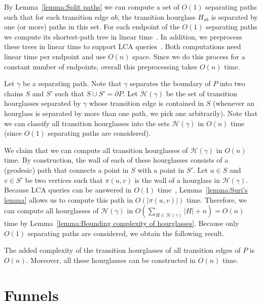 \documentclass[a4paper,UKenglish]{lipics}
\newcommand{\p}[2]{\ensuremath{\pi(#1, #2)}}
\begin{document}
By Lemma~\ref{lemma:Split paths} we can compute a set of $O(1)$ separating paths such that for each transition edge $ab$, the transition hourglass $H_{ab}$ is separated by one (or more) paths in this set. For each endpoint of the $O(1)$ separating paths we compute its shortest-path tree in linear time~\cite{chazelle1991triangulating,guibasShortestPathTree}. In addition, we preprocess these trees in linear time to support LCA queries~\cite{harel1984fast}. Both computations need linear time per endpoint and use $O(n)$ space. Since we do this process for a constant number of endpoints, overall this preprocessing takes $O(n)$ time. 

Let $\gamma$ be a separating path. Note that $\gamma$ separates the boundary of $P$ into two chains $S$ and $S'$ such that $S\cup S' = \partial P$.
Let $\mathcal H(\gamma)$ be the set of transition hourglasses separated by $\gamma$ whose transition edge is contained in $S$ (whenever an hourglass is separated by more than one path, we pick one arbitrarily). Note that we can classify all transition hourglasses into the sets $\mathcal H(\gamma)$ in $O(n)$ time (since $O(1)$ separating paths are considered).

We claim that we can compute all transition hourglasses of $\mathcal H(\gamma)$ in $O(n)$ time.
By construction, the wall of each of these hourglasses consists of a (geodesic) path that connects a point in $S$ with a point in $S'$. Let $u\in S$ and $v\in S'$ be two vertices such that $\p{u}{v}$ is the wall of a hourglass in $\mathcal H(\gamma)$.
Because LCA queries can be answered in $O(1)$ time~\cite{harel1984fast}, 
Lemma~\ref{lemma:Suri's lemma} allows us to compute this path in $O(|\p{u}{v}|)$ time. 
Therefore, we can compute all hourglasses of $\mathcal H(\gamma)$ in $O(\sum_{H\in \mathcal H(\gamma)} |H| + n) = O(n)$ time by Lemma~\ref{lemma:Bounding complexity of hourglasses}. 
Because only $O(1)$ separating paths are considered, we obtain the following result.

\begin{lemma}\label{lemma: Hourglass partition}
The added complexity of the transition hourglasses of all transition edges of $P$ is $O(n)$.
Moreover, all these hourglasses can be constructed in $O(n)$ time.
\end{lemma}

\section{Funnels}
\end{document}
